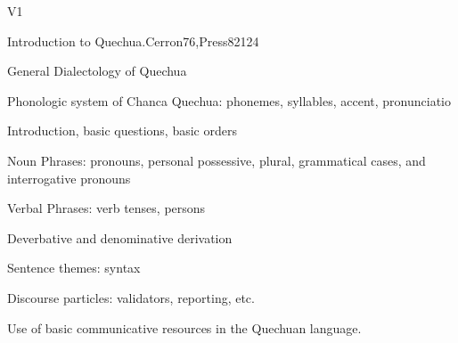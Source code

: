 \begin{syllabus}
\begin{competences}{V1}
    \item {}
    \item {}
    \item {}
    \item {}
\end{competences}

\begin{unit}{Introduction to Quechua.}{}{Cerron76,Press82}{12}{4}
   \begin{topics}
      \item General Dialectology of Quechua
      \item Phonologic system of Chanca Quechua: phonemes, syllables, accent, pronunciatio
      \item Introduction, basic questions, basic orders
      \item Noun Phrases: pronouns, personal possessive, plural, grammatical cases, and interrogative pronouns
      \item Verbal Phrases: verb tenses, persons
      \item Deverbative and denominative derivation
      \item Sentence themes: syntax
      \item Discourse particles: validators, reporting, etc.
   \end{topics}

   \begin{learningoutcomes}
      \item Use of basic communicative resources in the Quechuan language.
   \end{learningoutcomes}
\end{unit}

\begin{coursebibliography}
\end{coursebibliography}

\end{syllabus}
